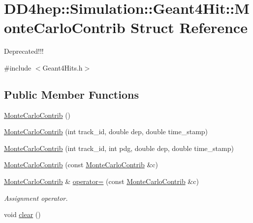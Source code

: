 \hypertarget{struct_d_d4hep_1_1_simulation_1_1_geant4_hit_1_1_monte_carlo_contrib}{
\section{DD4hep::Simulation::Geant4Hit::MonteCarloContrib Struct Reference}
\label{struct_d_d4hep_1_1_simulation_1_1_geant4_hit_1_1_monte_carlo_contrib}
}


Deprecated!!!  


{\ttfamily \#include $<$Geant4Hits.h$>$}\subsection*{Public Member Functions}
\begin{DoxyCompactItemize}
\item 
\hyperlink{struct_d_d4hep_1_1_simulation_1_1_geant4_hit_1_1_monte_carlo_contrib_ade0fa203d957c85105826a23916ead5e}{MonteCarloContrib} ()
\item 
\hyperlink{struct_d_d4hep_1_1_simulation_1_1_geant4_hit_1_1_monte_carlo_contrib_a3f041eca3c402f2a8ba5fec12151e42f}{MonteCarloContrib} (int track\_\-id, double dep, double time\_\-stamp)
\item 
\hyperlink{struct_d_d4hep_1_1_simulation_1_1_geant4_hit_1_1_monte_carlo_contrib_af4908b6ddf6b878d9d529a5e614ca0de}{MonteCarloContrib} (int track\_\-id, int pdg, double dep, double time\_\-stamp)
\item 
\hyperlink{struct_d_d4hep_1_1_simulation_1_1_geant4_hit_1_1_monte_carlo_contrib_a13103caeeef9b6d184177690693f8f51}{MonteCarloContrib} (const \hyperlink{struct_d_d4hep_1_1_simulation_1_1_geant4_hit_1_1_monte_carlo_contrib}{MonteCarloContrib} \&c)
\item 
\hyperlink{struct_d_d4hep_1_1_simulation_1_1_geant4_hit_1_1_monte_carlo_contrib}{MonteCarloContrib} \& \hyperlink{struct_d_d4hep_1_1_simulation_1_1_geant4_hit_1_1_monte_carlo_contrib_a7cd8b1e9b2e5767d1bcfce6fa38a398c}{operator=} (const \hyperlink{struct_d_d4hep_1_1_simulation_1_1_geant4_hit_1_1_monte_carlo_contrib}{MonteCarloContrib} \&c)
\begin{DoxyCompactList}\small\item\em Assignment operator. \item\end{DoxyCompactList}\item 
void \hyperlink{struct_d_d4hep_1_1_simulation_1_1_geant4_hit_1_1_monte_carlo_contrib_a008953a5a8c03687349c791160d2c89e}{clear} ()
\end{DoxyCompactItemize}
